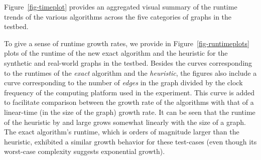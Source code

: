 Figure~\ref{fig-timeplot} provides an aggregated visual summary of the runtime trends of
the various algorithms across the five categories of graphs in the testbed. 


To give a sense of runtime growth rates, we provide in Figure~\ref{fig-runtimeplots} plots of the 
runtime of the new exact algorithm and the heuristic for the synthetic and real-world graphs 
in the testbed. Besides the curves corresponding to the runtimes of the
{\em exact} algorithm and the {\em heuristic}, the figures also include a curve corresponding to
the number of {\em edges} in the graph divided by the clock frequency of the computing
platform used in the experiment. This curve is added to facilitate comparison between
the growth rate of the algorithms with that of a linear-time (in the size of the graph) growth rate. 
It can be seen that the runtime of the heuristic by and large grows 
somewhat linearly with the size of a graph. The exact algorithm's runtime, which is orders of
magnitude larger than the heuristic, exhibited a similar growth behavior for these test-cases
(even though its worst-case complexity suggests exponential growth). 

